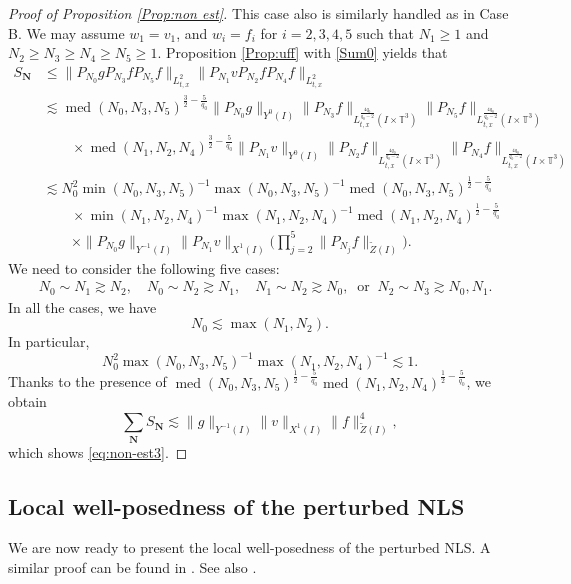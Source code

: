 \documentclass[letterpaper, 11pt,  reqno]{amsart}
\DeclareMathOperator{\med}{med}
\newcommand{\1}{\hspace{0.5mm}\text{I}\hspace{0.5mm}}
\newcommand{\T}{\mathbb{T}}
\newcommand{\wt}{\widetilde}
\newcommand{\les}{\lesssim}
\newcommand{\ges}{\gtrsim}
\newcommand{\Nb}{\mathbf{N}}
\numberwithin{equation}{section}
\numberwithin{theorem}{section}
\begin{document}
\begin{proof}[Proof of Proposition \ref{Prop:non est}]
This case also is similarly handled as in Case B.
We may
assume $w_1=v_1$,  
and $w_i=f_i$ for $i=2,3,4,5$
such that 
$N_1\geq 1$ 
and $N_2\geq N_3\geq N_4\geq N_5\geq 1$.
Proposition \ref{Prop:uff} with \eqref{Sum0} yields that
\begin{align*}
S_{\Nb}
&\le
\|P_{N_0}g P_{N_3}f P_{N_5}f\|_{L_{t,x}^2}
\|P_{N_1}v P_{N_2}f P_{N_4}f\|_{L_{t,x}^2}
\\
&\les
\med(N_0,N_3,N_5)^{\frac 32-\frac{5}{q_0}}
\|P_{N_0}g\|_{Y^0(I)}
\|P_{N_3}f\|_{L_{t,x}^{\frac{4q_0}{q_0-2}} (I \times \T^3)}
\|P_{N_5}f\|_{L_{t,x}^{\frac{4q_0}{q_0-2}} (I \times \T^3)}
\\
&\qquad
\times
\med(N_1,N_2,N_4)^{\frac 32-\frac{5}{q_0}}
\|P_{N_1}v\|_{Y^0(I)}
\|P_{N_2}f\|_{L_{t,x}^{\frac{4q_0}{q_0-2}} (I \times \T^3)}
\|P_{N_4}f\|_{L_{t,x}^{\frac{4q_0}{q_0-2}} (I \times \T^3)}
\\
&\les
N_0^2
\min(N_0,N_3,N_5)^{-1}
\max(N_0,N_3,N_5)^{-1}
\med(N_0,N_3,N_5)^{\frac 12-\frac{5}{q_0}}
\\
&\qquad
\times
\min(N_1,N_2,N_4)^{-1}
\max(N_1,N_2,N_4)^{-1}
\med(N_1,N_2,N_4)^{\frac 12 -\frac{5}{q_0}}
\\
&\qquad
\times
\|P_{N_0}g\|_{Y^{-1}(I)}
\| P_{N_1} v \|_{X^1(I)}
\bigg(
\prod_{j=2}^5
\| P_{N_j} f \|_{\wt Z(I)}
\bigg)
.
\end{align*}
We need to consider the following five cases:
\[
\begin{aligned}
&N_0 \sim N_1 \ges N_2, \quad
N_0 \sim N_2 \ges N_1, \quad
N_1 \sim N_2 \ges N_0, \
\text{ or } \
N_2 \sim N_3 \ges N_0, N_1.
\end{aligned}
\]
In all the cases,
we have
\[
N_0 \les
\max (N_1,N_2).
\]
In particular,
\[
N_0^2
\max(N_0,N_3,N_5)^{-1}
\max(N_1,N_2,N_4)^{-1}
\les 1.
\]
Thanks to the presence of
$\med(N_0,N_3,N_5)^{\frac 12 -\frac{5}{q_0}} \med(N_1,N_2,N_4)^{\frac 12-\frac{5}{q_0}}$,
we obtain
\[
\sum_{\Nb} S_\Nb
\les
\| g \|_{Y^{-1}(I)}
\| v \|_{X^1(I)}
\| f \|_{\wt Z(I)}^4,
\]
which shows  \eqref{eq:non-est3}.
\end{proof}



\subsection{Local well-posedness of the perturbed NLS}



We are now ready to present the local well-posedness of the perturbed NLS.
A similar proof can be found in \cite[Proposition 6.3]{BOP15}.
See also \cite[Proposition 3.3]{IP12}.
\end{document}
